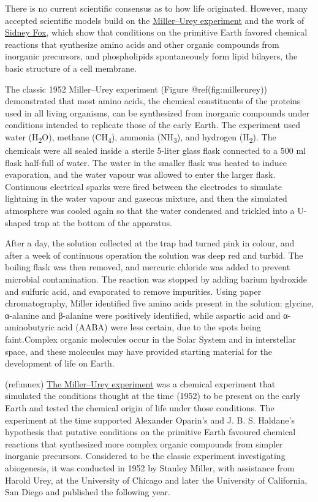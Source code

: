 \documentclass[
]{article}
\begin{document}
There is no current scientific consensus as to how life originated.
However, many accepted scientific models build on the
\href{https://en.wikipedia.org/wiki/Miller–Urey_experiment}{Miller--Urey
experiment} and the work of
\href{https://en.wikipedia.org/wiki/Sidney_W._Fox}{Sidney Fox}, which
show that conditions on the primitive Earth favored chemical reactions
that synthesize amino acids and other organic compounds from inorganic
precursors, and phospholipids spontaneously form lipid bilayers, the
basic structure of a cell membrane.

The classic 1952 Miller--Urey experiment (Figure @ref(fig:millerurey))
demonstrated that most amino acids, the chemical constituents of the
proteins used in all living organisms, can be synthesized from inorganic
compounds under conditions intended to replicate those of the early
Earth. The experiment used water (H\textsubscript{2}O), methane
(CH\textsubscript{4}), ammonia (NH\textsubscript{3}), and hydrogen
(H\textsubscript{2}). The chemicals were all sealed inside a sterile
5-liter glass flask connected to a 500 ml flask half-full of water. The
water in the smaller flask was heated to induce evaporation, and the
water vapour was allowed to enter the larger flask. Continuous
electrical sparks were fired between the electrodes to simulate
lightning in the water vapour and gaseous mixture, and then the
simulated atmosphere was cooled again so that the water condensed and
trickled into a U-shaped trap at the bottom of the apparatus.

After a day, the solution collected at the trap had turned pink in
colour, and after a week of continuous operation the solution was deep
red and turbid. The boiling flask was then removed, and mercuric
chloride was added to prevent microbial contamination. The reaction was
stopped by adding barium hydroxide and sulfuric acid, and evaporated to
remove impurities. Using paper chromatography, Miller identified five
amino acids present in the solution: glycine, α-alanine and β-alanine
were positively identified, while aspartic acid and α-aminobutyric acid
(AABA) were less certain, due to the spots being faint.Complex organic
molecules occur in the Solar System and in interstellar space, and these
molecules may have provided starting material for the development of
life on Earth.

(ref:muex)
\href{https://commons.wikimedia.org/wiki/File:MUexperiment.png}{The
Miller--Urey experiment} was a chemical experiment that simulated the
conditions thought at the time (1952) to be present on the early Earth
and tested the chemical origin of life under those conditions. The
experiment at the time supported Alexander Oparin's and J. B. S.
Haldane's hypothesis that putative conditions on the primitive Earth
favoured chemical reactions that synthesized more complex organic
compounds from simpler inorganic precursors. Considered to be the
classic experiment investigating abiogenesis, it was conducted in 1952
by Stanley Miller, with assistance from Harold Urey, at the University
of Chicago and later the University of California, San Diego and
published the following year.
\end{document}
